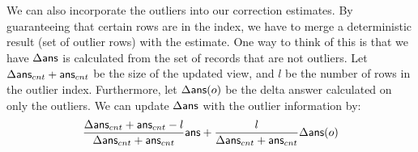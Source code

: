 We can also incorporate the outliers into our correction estimates. 
By guaranteeing that certain rows are in the index, we
have to merge a deterministic result (set of outlier rows) with the
estimate. One way to think of this is that we have $\Delta\textsf{ans}$ is
calculated from the set of records that are not outliers. Let $\Delta\textsf{ans}_{cnt} + \textsf{ans}_{cnt}$
be the size of the updated view, and $l$ be the number of rows in the
outlier index. Furthermore, let $\Delta\textsf{ans}(o)$ be the delta answer calculated on only the outliers.
We can update $\Delta\textsf{ans}$ with the outlier information by:
\[
\frac{\Delta\textsf{ans}_{cnt} + \textsf{ans}_{cnt}-l}{\Delta\textsf{ans}_{cnt} + \textsf{ans}_{cnt}}\textsf{ans}+\frac{l}{\Delta\textsf{ans}_{cnt} + \textsf{ans}_{cnt}}\Delta\textsf{ans}(o)
\]